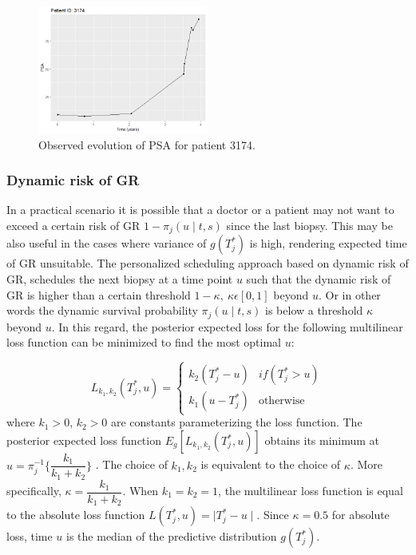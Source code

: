 \begin{figure}[!htb]
    \centering
    \captionsetup{justification=centering}
    \includegraphics[width=0.5\textwidth]{images/observed_psa_3174.png}
    \caption{Observed evolution of PSA for patient 3174.}
    \label{fig : observed_psa_3174}
\end{figure}

\subsubsection{Dynamic risk of GR}
\label{subsubsec : dynamic_risk_definitions}
In a practical scenario it is possible that a doctor or a patient may not want to exceed a certain risk of GR $1 - \pi_j(u \mid t, s)$ since the last biopsy. This may be also useful in the cases where variance of $g(T^*_j)$ is high, rendering expected time of GR unsuitable. The personalized scheduling approach based on dynamic risk of GR, schedules the next biopsy at a time point $u$ such that the dynamic risk of GR is higher than a certain threshold $1-\kappa,\ \kappa \epsilon [0,1]$ beyond $u$. Or in other words the dynamic survival probability $\pi_j(u \mid t, s)$ is below a threshold $\kappa$ beyond $u$. In this regard, the posterior expected loss for the following multilinear loss function can be minimized to find the most optimal $u$:

\begin{equation}
\label{eq : loss_dynamic_risk}
L_{k_1, k_2}(T^*_j, u) =
    \begin{cases}
      k_2(T^*_j-u) & if(T^*_j > u)\\
      k_1(u-T^*_j) & \text{otherwise}
    \end{cases}       
\end{equation}
where $k_1 > 0$, $k_2 > 0$ are constants parameterizing the loss function. The posterior expected loss function $E_g[L_{k_1, k_2}(T^*_j, u)]$ obtains its minimum at $u = \pi_j^{-1}\Big\{\dfrac{k_1}{k_1 + k_2}\Big\}$ \citep{robertBayesianChoice}. The choice of $k_1, k_2$ is equivalent to the choice of $\kappa$. More specifically, $\kappa = \dfrac{k_1}{k_1 + k_2}$. When $k_1=k_2=1$, the multilinear loss function is equal to the absolute loss function $L(T^*_j, u) = \mid T^*_j - u \mid$. Since $\kappa = 0.5$ for absolute loss, time $u$ is the median of the predictive distribution $g(T^*_j)$.


